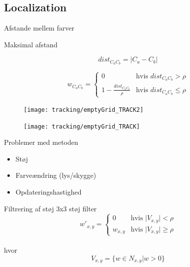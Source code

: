 \subsection{Localization}

\begin{frame}{Afstande mellem farver}

\centering


\end{frame}

\begin{frame}{Maksimal afstand}

$$dist_{C_aC_b} = \vert C_a - C_b \vert$$

$$w_{C_aC_b} = \begin{cases}
	0 &\text{hvis } dist_{C_aC_b} > \rho \\
	1 - \frac{dist_{C_aC_b}}{\rho} &\text{hvis } dist_{C_aC_b} \leq \rho
\end{cases}$$

\end{frame}

\begin{frame}

\begin{figure}
\centering
\texttt{[image: tracking/emptyGrid\_TRACK2]}

\texttt{[image: tracking/emptyGrid\_TRACK]}

\end{figure}
\end{frame}

\begin{frame}{Problemer med metoden}
\begin{itemize}
\item Støj
\item Farveændring (lys/skygge)
\item Opdateringshastighed
\end{itemize}

\end{frame}



\begin{frame}{Filtrering af støj}
3x3 støj filter \\


$$w'_{x,y} = \begin{cases}
	0 &\text{hvis } \vert V_{x,y} \vert < \rho \\
	w_{x,y} &\text{hvis } \vert V_{x,y} \vert \geq \rho
\end{cases}$$ \\
hvor $$V_{x,y} = \{w \in N_{x,y} \vert w > 0 \}$$
\end{frame}

